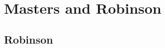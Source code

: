 \documentclass[10pt]{article}
\begin{document}
\section{Masters and Robinson}
\subsection{Robinson}
\end{document}
